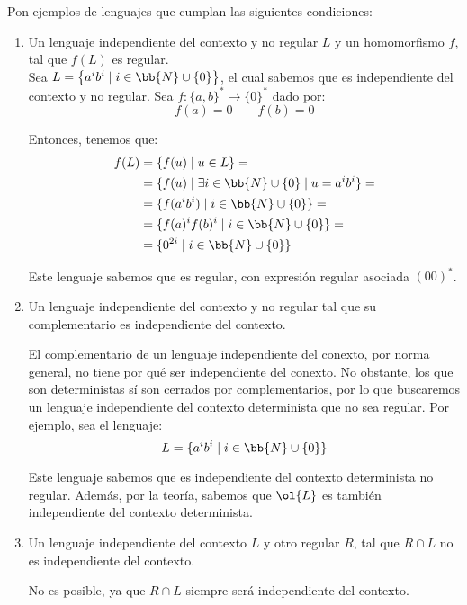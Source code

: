 \documentclass[12pt]{article}
\begin{document}
    \begin{ejercicio}[1.25 puntos]
        Pon ejemplos de lenguajes que cumplan las siguientes condiciones:
        \begin{enumerate}
            \item Un lenguaje independiente del contexto y no regular $L$ y un homomorfismo $f$, tal que $f(L)$ es regular.\\
            
            Sea $L=\left\{a^ib^i\mid i\in \bb{N}\cup\{0\}\right\}$, el cual sabemos que es independiente del contexto y no regular. Sea $f:\{a,b\}^*\to \{0\}^*$ dado por:
            \begin{equation*}
                f(a)=0\qquad f(b)=0
            \end{equation*}

            Entonces, tenemos que:
            \begin{align*}
                f(L)&=\{f(u)\mid u\in L\}
                =\\&=\{f(u)\mid \exists i\in \bb{N}\cup \{0\}\mid u=a^ib^i\}
                =\\&=\{f(a^ib^i)\mid i\in \bb{N}\cup \{0\}\}
                =\\&=\{f(a)^if(b)^i\mid i\in \bb{N}\cup \{0\}\}
                =\\&=\{0^{2i}\mid i\in \bb{N}\cup \{0\}\}
            \end{align*}

            Este lenguaje sabemos que es regular, con expresión regular asociada $(00)^*$.
            \item Un lenguaje independiente del contexto y no regular tal que su complementario es independiente del contexto.
            
            El complementario de un lenguaje independiente del conexto, por norma general, no tiene por qué ser independiente del conexto. No obstante, los que son deterministas sí son cerrados por complementarios, por lo que buscaremos un lenguaje independiente del contexto determinista que no sea regular. Por ejemplo, sea el lenguaje:
            \begin{equation*}
                L=\{a^ib^i\mid i\in \bb{N}\cup \{0\}\}
            \end{equation*}

            Este lenguaje sabemos que es independiente del contexto determinista no regular. Además, por la teoría, sabemos que $\ol{L}$ es también independiente del contexto determinista.
            \item Un lenguaje independiente del contexto $L$ y otro regular $R$, tal que $R \cap L$ no es independiente del contexto.
            
            No es posible, ya que $R\cap L$ siempre será independiente del contexto.
        \end{enumerate}
    \end{ejercicio}
\end{document}

